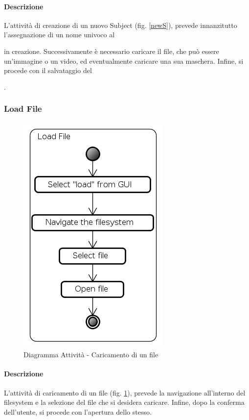 \paragraph{Descrizione\\}
L'attività di creazione di un nuovo Subject\glossario{} (fig. \ref{newS}), prevede innanzitutto l'assegnazione di un nome univoco al \subject{} in creazione. Successivamente è necessario caricare il file, che può essere un'immagine o un video, ed eventualmente caricare una sua maschera. Infine, si procede con il salvataggio del \subject{}.
\pagebreak

\subsubsection{Load File}
\label{LoadF}
\begin{figure}[!h]
\centering
\includegraphics[width=0.4\linewidth]{./Content/Immagini/Load_File}
\caption{Diagramma Attività - Caricamento di un file}
\label{Load}
\end{figure}
\paragraph{Descrizione\\}
L'attività di caricamento di un file (fig. \ref{Load}), prevede la navigazione all'interno del filesystem e la selezione del file che si desidera caricare. Infine, dopo la conferma dell'utente, si procede con l'apertura dello stesso.
\pagebreak

